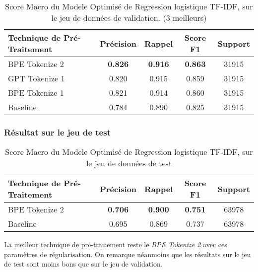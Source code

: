 \begin{table}[ht]
    \centering
    \caption{Score Macro du Modele Optimisé de Regression logistique TF-IDF, sur le jeu de données de validation. (3 meilleurs)}
    \begin{tabular}{lcccc}
    \hline
    \textbf{Technique de Pré-Traitement} & \textbf{Précision} & \textbf{Rappel} & \textbf{Score F1} & \textbf{Support} \\ \hline
    BPE Tokenize 2                          & \textbf{0.826}              & \textbf{0.916}           & \textbf{0.863}             & 31915            \\
    GPT Tokenize 1                          & 0.820              & 0.915           & 0.859             & 31915            \\
    BPE Tokenize 1                           & 0.821              & 0.914           & 0.860             & 31915            \\ \hline
    Baseline             & 0.784             & 0.890           & 0.825             & 31915            \\ \hline
\end{tabular}
\label{tab:results}
\end{table}


\subsubsection{Résultat sur le jeu de test}
\begin{table}[ht]
    \centering
    \caption{Score Macro du Modele Optimisé de Regression logistique TF-IDF, sur le jeu de données de test}
    \begin{tabular}{lcccc}
    \hline
    \textbf{Technique de Pré-Traitement} & \textbf{Précision} & \textbf{Rappel} & \textbf{Score F1} & \textbf{Support} \\ \hline
    BPE Tokenize 2                          & \textbf{0.706}              & \textbf{0.900}           & \textbf{0.751}            & 63978            \\\hline
    Baseline                               & 0.695              & 0.869           & 0.737             & 63978            \\ \hline
\end{tabular}
\label{tab:results}
\end{table}
La meilleur technique de pré-traitement reste le \textit{BPE Tokenize 2} avec ces paramètres de régularisation.
On remarque néanmoins que les résultats sur le jeu de test sont moins bons que sur le jeu de validation.

